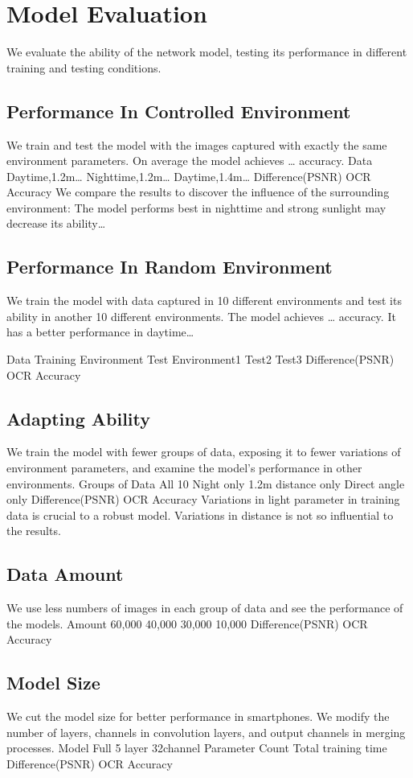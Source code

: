 
\section{Model Evaluation}
We evaluate the ability of the network model, testing its performance in different training and testing conditions.
\subsection{Performance In Controlled Environment}
We train and test the model with the images captured with exactly the same environment parameters. On average the model achieves … accuracy.
Data	Daytime,1.2m… 	Nighttime,1.2m…	Daytime,1.4m…					
Difference(PSNR)								
OCR Accuracy								
We compare the results to discover the influence of the surrounding environment: The model performs best in nighttime and strong sunlight may decrease its ability…
\subsection{Performance In Random Environment}
We train the model with data captured in 10 different environments and test its ability in another 10 different environments. The model achieves … accuracy. It has a better performance in daytime…


Data	Training Environment  	Test
Environment1	Test2	Test3				
Difference(PSNR)								
OCR Accuracy								
\subsection{Adapting Ability}
We train the model with fewer groups of data, exposing it to fewer variations of environment parameters, and examine the model’s performance in other environments.
Groups of Data	All 10	Night only	1.2m distance only	Direct angle only				
Difference(PSNR)								
OCR Accuracy								
Variations in light parameter in training data is crucial to a robust model. Variations in distance is not so influential to the results.
\subsection{Data Amount}
We use less numbers of images in each group of data and see the performance of the models.
Amount	60,000	40,000	30,000	10,000				
Difference(PSNR)								
OCR Accuracy								
\subsection{Model Size}
We cut the model size for better performance in smartphones. We modify the number of layers, channels in convolution layers, and output channels in merging processes.
Model	Full	5 layer	32channel					
Parameter Count								
Total training time								
Difference(PSNR)								
OCR Accuracy								
